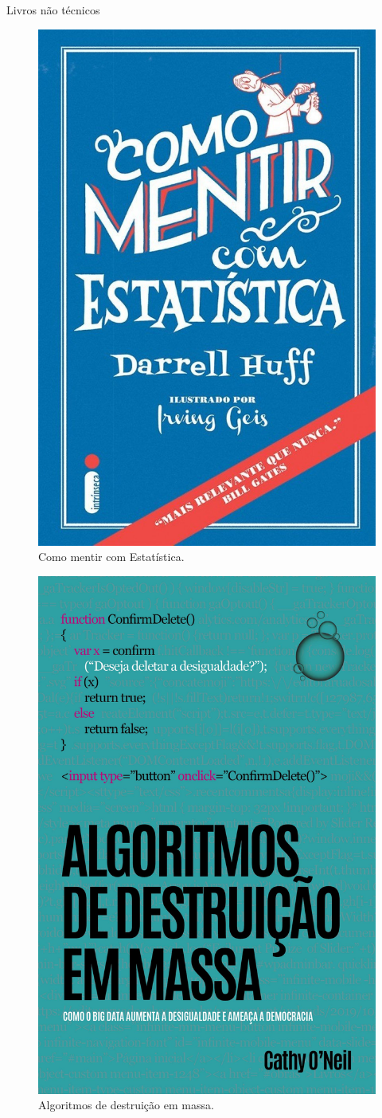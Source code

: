 \documentclass[
  ignorenonframetext,
  serif,
  professionalfont,
  usenames,
  dvipsnames,
  aspectratio = 169]{beamer}
\def\beginAHalfColumn{\begin{minipage}{0.49\textwidth}}%
\def\endColumns{\end{minipage}}%
\begin{document}
\begin{frame}{Livros não técnicos}
\label{livros-nuxe3o-tuxe9cnicos-1}
\beginAHalfColumn

\begin{figure}

{\centering \includegraphics[width=0.5\linewidth]{./img/mentir} 

}

\caption{Como mentir com Estatística.}\label{fig:unnamed-chunk-17}
\end{figure}

\endColumns
\beginAHalfColumn

\begin{figure}

{\centering \includegraphics[width=0.5\linewidth]{./img/algoritmos} 

}

\caption{Algoritmos de destruição em massa.}\label{fig:unnamed-chunk-18}
\end{figure}

\endColumns
\end{frame}
\end{document}
